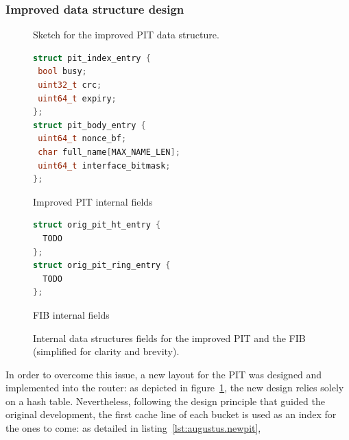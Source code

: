 \documentclass[12pt,a4paper,twoside]{book}
\begin{document}
\subsubsection{Improved data structure design}\label{sec:augustus.pit.new}

\begin{figure}[htb]
  \begin{center}
    \caption[Sketch for the improved PIT data structure]{Sketch for the improved PIT data structure.}
    \label{fig:augustus.newpit}
  \end{center}
\end{figure}

\begin{figure}[htb]
  \captionsetup{type=lstlisting}
  \begin{sublstlisting}[t]{.5\linewidth}
  \begin{lstlisting}[language=c]
struct pit_index_entry {
 bool busy;
 uint32_t crc;
 uint64_t expiry;
};
struct pit_body_entry {
 uint64_t nonce_bf;
 char full_name[MAX_NAME_LEN];
 uint64_t interface_bitmask;
};
    \end{lstlisting}
    \caption{Improved PIT internal fields}\label{lst:augustus.newpit}
  \end{sublstlisting}%
  \begin{sublstlisting}[t]{.5\linewidth}
  \begin{lstlisting}[language=c]
struct orig_pit_ht_entry {
  TODO
};
struct orig_pit_ring_entry {
  TODO
};
    \end{lstlisting}
    \caption{FIB internal fields}\label{lst:augustus.fib}
  \end{sublstlisting}
  \caption[Internal data structures fields for the improved PIT and the FIB]{Internal data structures fields for the improved PIT and the FIB (simplified for clarity and brevity).}\label{lst:augustus.newpit_fib}
\end{figure}
In order to overcome this issue, a new layout for the PIT was designed and implemented into the router: as depicted in figure~\ref{fig:augustus.newpit}, the new design relies solely on a hash table. Nevertheless, following the design principle that guided the original development, the first cache line of each bucket is used as an index for the ones to come: as detailed in listing~\ref{lst:augustus.newpit}, 
\end{document}
